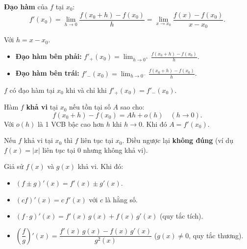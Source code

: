 \documentclass[12pt,a4paper]{article}
\begin{document}
\begin{dinhnghia}
  \textbf{Đạo hàm} của $f$ tại $x_0$:
  \[
    f'(x_0) = \lim_{h \to 0} \frac{f(x_0 + h) - f(x_0)}{h} = \lim_{x \to x_0} \frac{f(x) - f(x_0)}{x - x_0}.
  \]

  Với $h = x - x_0$.
\end{dinhnghia}

\begin{dinhnghia}[title={Đạo hàm một phía}]
  \begin{itemize}
    \item \textbf{Đạo hàm bên phải:} $f'_+(x_0) = \displaystyle\lim_{h \to 0^+} \frac{f(x_0 + h) - f(x_0)}{h}$.
    \item \textbf{Đạo hàm bên trái:} $f'_-(x_0) = \displaystyle\lim_{h \to 0^-} \frac{f(x_0 + h) - f(x_0)}{h}$.
  \end{itemize}
  $f$ có đạo hàm tại $x_0$ khi và chỉ khi $f'_+(x_0) = f'_-(x_0)$.
\end{dinhnghia}

\begin{dinhnghia}[title={Tính khả vi}]
  Hàm $f$ \textbf{khả vi} tại $x_0$ nếu tồn tại số $A$ sao cho:
  \[
    f(x_0 + h) - f(x_0) = Ah + o(h) \quad (h \to 0).
  \]
  Với $o(h)$ là 1 VCB bậc cao hơn $h$ khi $h \to 0$. Khi đó $A = f'(x_0)$.
\end{dinhnghia}

\begin{dinhly}
  Nếu $f$ khả vi tại $x_0$ thì $f$ liên tục tại $x_0$. Điều ngược lại \textbf{không đúng} (ví dụ $f(x) = |x|$ liên tục tại $0$ nhưng không khả vi).
\end{dinhly}

\begin{tinhchat}[title={Đạo hàm và phép toán đại số}]
  Giả sử $f(x)$ và $g(x)$ khả vi. Khi đó:
  \begin{itemize}
    \item $(f \pm g)'(x) = f'(x) \pm g'(x)$.
    \item $(cf)'(x) = c\,f'(x)$ với $c$ là hằng số.
    \item $(f \cdot g)'(x) = f'(x)\,g(x) + f(x)\,g'(x)$ \quad (quy tắc tích).
    \item $\left(\dfrac{f}{g}\right)'(x) = \dfrac{f'(x)\,g(x) - f(x)\,g'(x)}{g^2(x)}$ \quad ($g(x) \ne 0$, quy tắc thương).
  \end{itemize}
\end{tinhchat}
\end{document}

